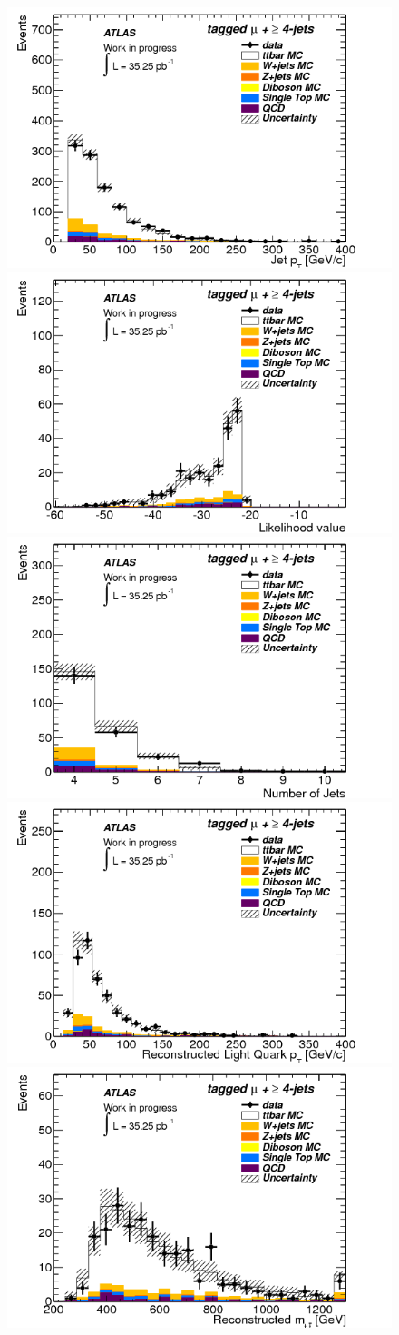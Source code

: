 \begin{figure}[!hb]
\begin{center}
		\includegraphics[width=.47\textwidth]{figures/kinFit_appendix/validation/JetpT_mu}
		\includegraphics[width=.47\textwidth]{figures/kinFit_appendix/validation/Likelihood_mu}\\
		\includegraphics[width=.47\textwidth]{figures/kinFit_appendix/validation/NumberofJets_mu}
		\includegraphics[width=.47\textwidth]{figures/kinFit_appendix/validation/RecoLightQuark_pT_mu}\\
		\includegraphics[width=.47\textwidth]{figures/kinFit_appendix/validation/Reco_m_ttbar_mu}

\end{center}
\end{figure}
